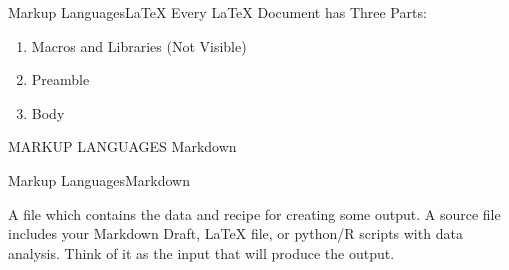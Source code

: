 \documentclass{beamer}
\begin{document}
\begin{frame}{Markup Languages}{\LaTeX}
    Every LaTeX Document has Three Parts:
    \begin{enumerate}
        \item Macros and Libraries (Not Visible)
        \item Preamble
        \item Body
    \end{enumerate}
\end{frame}

\begin{frame}
    \Huge{MARKUP LANGUAGES} \newline
    \large{Markdown}
\end{frame}

\begin{frame}{Markup Languages}{Markdown}
    
        \begin{description}
        \item[Source File]
        A file which contains the data and recipe for creating some output. A
        source file includes your Markdown Draft, LaTeX file, or python/R
        scripts with data analysis. Think of it as the input that will produce
        the output.
        \end{description}
    
\end{frame}
\end{document}
